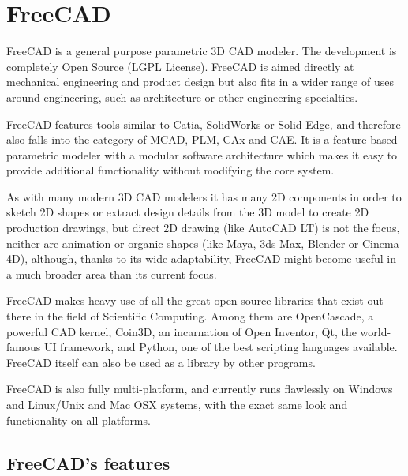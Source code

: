 \section{FreeCAD}
FreeCAD is a general purpose parametric 3D CAD modeler. The development 
is completely Open Source (LGPL License). FreeCAD is aimed directly at  
mechanical engineering and product design but also fits in a wider range
of uses around engineering, such as architecture or other engineering specialties.
                                                                        
FreeCAD features tools similar to Catia, SolidWorks or Solid Edge, and  
therefore also falls into the category of MCAD, PLM, CAx and CAE. It is a
feature based parametric modeler with a modular software architecture which
makes it easy to provide additional functionality without modifying the core system.
                                                                        
As with many modern 3D CAD modelers it has many 2D components in order  
to sketch 2D shapes or extract design details from the 3D model to create
2D production drawings, but direct 2D drawing (like AutoCAD LT) is not the
focus, neither are animation or organic shapes (like Maya, 3ds Max, Blender
or Cinema 4D), although, thanks to its wide adaptability, FreeCAD might 
become useful in a much broader area than its current focus.            
                                                                        
FreeCAD makes heavy use of all the great open-source libraries that exist
out there in the field of Scientific Computing. Among them are OpenCascade,
a powerful CAD kernel, Coin3D, an incarnation of Open Inventor, Qt, the world-famous
UI framework, and Python, one of the best scripting languages available.
FreeCAD itself can also be used as a library by other programs.         
                                                                        
FreeCAD is also fully multi-platform, and currently runs flawlessly on  
Windows and Linux/Unix and Mac OSX systems, with the exact same look and
functionality on all platforms.

\subsection{FreeCAD's features}
